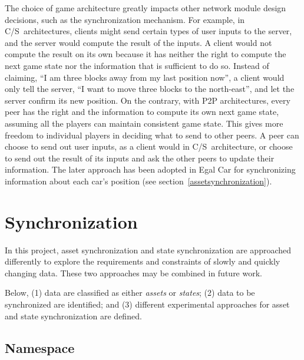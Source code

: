 \documentclass{article}
\newcommand{\cs}{C\slash S}
\begin{document}
The choice of game architecture greatly impacts other network module design decisions, such as the synchronization mechanism. For example, in \cs~architectures, clients might send certain types of user inputs to the server, and the server would compute the result of the inputs. A client would not compute the result on its own because it has neither the right to compute the next game state nor the information that is sufficient to do so. Instead of claiming, ``I am three blocks away from my last position now'', a client would only tell the server, ``I want to move three blocks to the north-east'', and let the server confirm its new position. On the contrary, with P2P architectures, every peer has the right and the information to compute its own next game state, assuming all the players can maintain consistent game state.
This gives more freedom to individual players in deciding what to send to other peers. A peer can choose to send out user inputs, as a client would in \cs~architecture, or choose to send out the result of its inputs and ask the other peers to update their information. The later approach has been adopted in Egal Car for synchronizing information about each car's position (see section~\ref{assetsynchronization}).


\section{Synchronization}
\label{synchronization}

In this project, asset synchronization and state synchronization are approached differently to explore the requirements and constraints of slowly and quickly changing data.  These two approaches may be combined in future work. 

Below, (1) data are classified as either \emph{assets} or \emph{states}; 
(2) data to be synchronized are identified; and
(3) different experimental approaches for asset and state synchronization are defined.



\subsection{Namespace}
\label{namespace}
\end{document}
